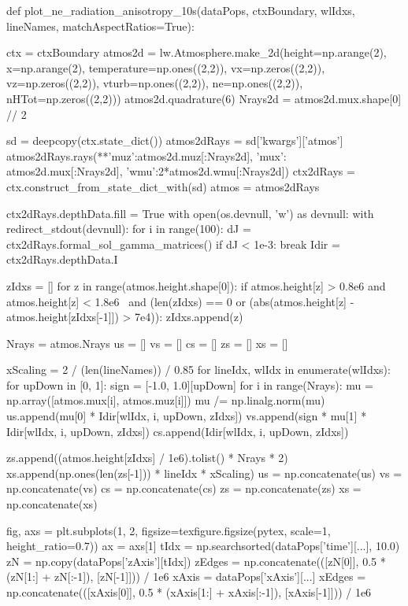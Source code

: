 \begin{pycode}[2DRT]
def plot_ne_radiation_anisotropy_10s(dataPops, ctxBoundary, wlIdxs, lineNames, matchAspectRatios=True):

    ctx = ctxBoundary
    atmos2d = lw.Atmosphere.make_2d(height=np.arange(2), x=np.arange(2), temperature=np.ones((2,2)),
                                vx=np.zeros((2,2)), vz=np.zeros((2,2)), vturb=np.ones((2,2)),
                                ne=np.ones((2,2)), nHTot=np.zeros((2,2)))
    atmos2d.quadrature(6)
    Nrays2d = atmos2d.mux.shape[0] // 2

    sd = deepcopy(ctx.state_dict())
    atmos2dRays = sd['kwargs']['atmos']
    atmos2dRays.rays(**{'muz':atmos2d.muz[:Nrays2d], 'mux': atmos2d.mux[:Nrays2d], 'wmu':2*atmos2d.wmu[:Nrays2d]})
    ctx2dRays = ctx.construct_from_state_dict_with(sd)
    atmos = atmos2dRays

    ctx2dRays.depthData.fill = True
    with open(os.devnull, 'w') as devnull:
        with redirect_stdout(devnull):
            for i in range(100):
                dJ = ctx2dRays.formal_sol_gamma_matrices()
                if dJ < 1e-3:
                    break
    Idir = ctx2dRays.depthData.I

    zIdxs = []
    for z in range(atmos.height.shape[0]):
        if atmos.height[z] > 0.8e6 and atmos.height[z] < 1.8e6 \
           and (len(zIdxs) == 0 or (abs(atmos.height[z] - atmos.height[zIdxs[-1]]) > 7e4)):
            zIdxs.append(z)

    Nrays = atmos.Nrays
    us = []
    vs = []
    cs = []
    zs = []
    xs = []

    xScaling = 2 / (len(lineNames)) / 0.85
    for lineIdx, wlIdx in enumerate(wlIdxs):
        for upDown in [0, 1]:
            sign = [-1.0, 1.0][upDown]
            for i in range(Nrays):
                mu = np.array([atmos.mux[i], atmos.muz[i]])
                mu /= np.linalg.norm(mu)
                us.append(mu[0] * Idir[wlIdx, i, upDown, zIdxs])
                vs.append(sign * mu[1] * Idir[wlIdx, i, upDown, zIdxs])
                cs.append(Idir[wlIdx, i, upDown, zIdxs])


        zs.append((atmos.height[zIdxs] / 1e6).tolist() * Nrays * 2)
        xs.append(np.ones(len(zs[-1])) * lineIdx * xScaling)
    us = np.concatenate(us)
    vs = np.concatenate(vs)
    cs = np.concatenate(cs)
    zs = np.concatenate(zs)
    xs = np.concatenate(xs)

    fig, axs = plt.subplots(1, 2,
                            figsize=texfigure.figsize(pytex, scale=1, height_ratio=0.7))
    ax = axs[1]
    tIdx = np.searchsorted(dataPops['time'][...], 10.0)
    zN = np.copy(dataPops['zAxis'][tIdx])
    zEdges = np.concatenate(([zN[0]], 0.5 * (zN[1:] + zN[:-1]), [zN[-1]])) / 1e6
    xAxis = dataPops['xAxis'][...]
    xEdges = np.concatenate(([xAxis[0]], 0.5 * (xAxis[1:] + xAxis[:-1]), [xAxis[-1]])) / 1e6


\end{pycode}
